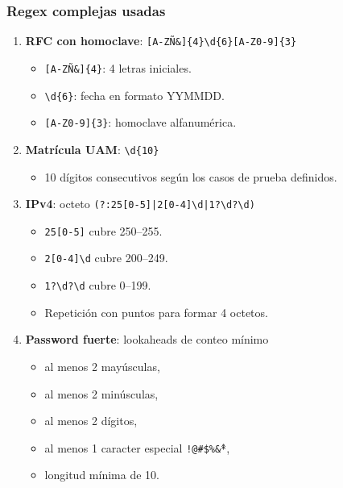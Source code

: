 \documentclass[12pt]{article}
\begin{document}
\subsubsection*{Regex complejas usadas}
\begin{enumerate}[leftmargin=*]
    \item \textbf{RFC con homoclave}: \texttt{[A-ZÑ\&]\{4\}\textbackslash d\{6\}[A-Z0-9]\{3\}}
    \begin{itemize}
        \item \texttt{[A-ZÑ\&]\{4\}}: 4 letras iniciales.
        \item \texttt{\textbackslash d\{6\}}: fecha en formato YYMMDD.
        \item \texttt{[A-Z0-9]\{3\}}: homoclave alfanumérica.
    \end{itemize}

    \item \textbf{Matrícula UAM}: \texttt{\textbackslash d\{10\}}
    \begin{itemize}
        \item 10 dígitos consecutivos según los casos de prueba definidos.
    \end{itemize}

    \item \textbf{IPv4}: octeto \texttt{(?:25[0-5]|2[0-4]\textbackslash d|1?\textbackslash d?\textbackslash d)}
    \begin{itemize}
        \item \texttt{25[0-5]} cubre 250--255.
        \item \texttt{2[0-4]\textbackslash d} cubre 200--249.
        \item \texttt{1?\textbackslash d?\textbackslash d} cubre 0--199.
        \item Repetición con puntos para formar 4 octetos.
    \end{itemize}

    \item \textbf{Password fuerte}: lookaheads de conteo mínimo
    \begin{itemize}
        \item al menos 2 mayúsculas,
        \item al menos 2 minúsculas,
        \item al menos 2 dígitos,
        \item al menos 1 caracter especial \texttt{!@\#\$\%\^\&*},
        \item longitud mínima de 10.
    \end{itemize}
\end{enumerate}
\end{document}

